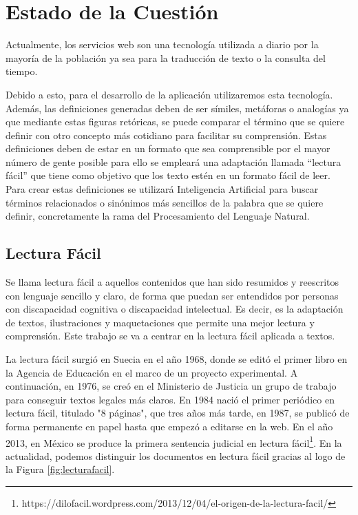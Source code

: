 \chapter{Estado de la Cuestión}
\label{cap:estadoDeLaCuestion}



Actualmente, los servicios web son una tecnología utilizada a diario por la mayoría de la población ya sea para la traducción de texto o la consulta del tiempo.

Debido a esto, para el desarrollo de la aplicación utilizaremos esta tecnología. Además, las definiciones generadas deben de ser símiles, metáforas o analogías ya que mediante estas figuras retóricas, se puede comparar el término que se quiere definir con otro concepto más cotidiano para facilitar su comprensión. Estas definiciones deben de estar en un formato que sea comprensible por el mayor número de gente posible para ello se empleará una adaptación llamada ``lectura fácil'' que tiene como objetivo que los texto estén en un formato fácil de leer. Para crear estas definiciones se utilizará Inteligencia Artificial para buscar términos relacionados o sinónimos más sencillos de la palabra que se quiere definir, concretamente la rama del Procesamiento del Lenguaje Natural.

\section{Lectura Fácil}
\label{cap:sec:lecturafacil}

Se llama lectura fácil a aquellos contenidos que han sido resumidos y reescritos con lenguaje sencillo y claro, de forma que puedan ser entendidos por personas con discapacidad cognitiva o discapacidad intelectual. Es decir, es la adaptación de textos, ilustraciones y maquetaciones que permite una mejor lectura y comprensión.
Este trabajo se va a centrar en la lectura fácil aplicada a textos.

La lectura fácil surgió en Suecia en el año 1968, donde se editó el primer libro en la Agencia de Educación en el marco de un proyecto experimental. A continuación, en 1976, se creó en el Ministerio de Justicia un grupo de trabajo para conseguir textos legales más claros.
En 1984 nació el primer periódico en lectura fácil, titulado "8 páginas", que tres años más tarde, en 1987, se publicó de forma permanente en papel hasta que empezó a editarse en la web. 
En el año 2013, en México se produce la primera sentencia judicial en lectura fácil\footnote{https://dilofacil.wordpress.com/2013/12/04/el-origen-de-la-lectura-facil/}. En la actualidad, podemos distinguir los documentos en lectura fácil gracias al logo de la Figura \ref{fig:lecturafacil}.

